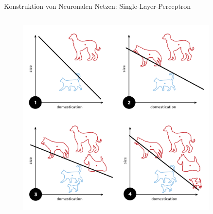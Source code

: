 \documentclass[aspectratio=1610, xcolor=dvipsnames, 9pt]{beamer}
\begin{document}
\begin{frame}{Konstruktion von Neuronalen Netzen: Single-Layer-Perceptron}
\begin{columns}
\begin{column}{0.3\textwidth}
\begin{figure}
                   \includegraphics[width=0.9\textwidth]{images/Perceptron_example.svg.png}
       \end{figure}
          \end{column}
        \end{columns}
      \end{frame}
\end{document}
